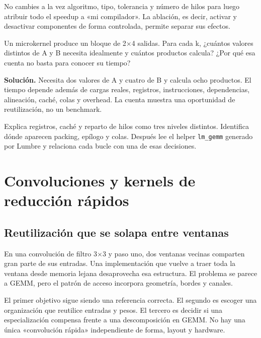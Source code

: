 \documentclass[12pt,a4paper,oneside]{report}
\begin{document}
No cambies a la vez algoritmo, tipo, tolerancia y número de hilos para luego atribuir todo el speedup a «mi compilador». La ablación, es decir, activar y desactivar componentes de forma controlada, permite separar sus efectos.

\begin{practica}
Un microkernel produce un bloque de 2\ensuremath{\times}4 salidas. Para cada k, ¿cuántos valores distintos de A y B necesita idealmente y cuántos productos calcula? ¿Por qué esa cuenta no basta para conocer su tiempo?

\end{practica}
\textbf{Solución.} Necesita dos valores de A y cuatro de B y calcula ocho productos. El tiempo depende además de cargas reales, registros, instrucciones, dependencias, alineación, caché, colas y overhead. La cuenta muestra una oportunidad de reutilización, no un benchmark.

\begin{comprueba}
Explica registros, caché y reparto de hilos como tres niveles distintos. Identifica dónde aparecen packing, epílogo y colas. Después lee el helper \texttt{lm\_gemm} generado por Lumbre y relaciona cada bucle con una de esas decisiones.

\end{comprueba}

\chapter{Convoluciones y kernels de reducción rápidos}
\label{ch:convs}
\section{Reutilización que se solapa entre ventanas}
En una convolución de filtro 3\ensuremath{\times}3 y paso uno, dos ventanas vecinas comparten gran parte de sus entradas. Una implementación que vuelve a traer toda la ventana desde memoria lejana desaprovecha esa estructura. El problema se parece a GEMM, pero el patrón de acceso incorpora geometría, bordes y canales.

El primer objetivo sigue siendo una referencia correcta. El segundo es escoger una organización que reutilice entradas y pesos. El tercero es decidir si una especialización compensa frente a una descomposición en GEMM. No hay una única «convolución rápida» independiente de forma, layout y hardware.
\end{document}
